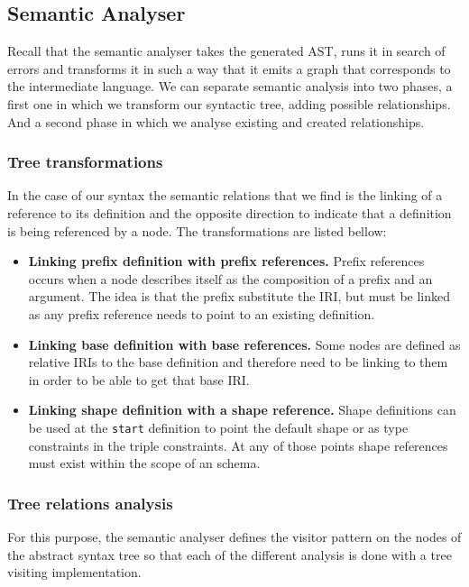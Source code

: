\subsection{Semantic Analyser}
Recall that the semantic analyser takes the generated AST, runs it in search of errors and transforms it in such a way that
it emits a graph that corresponds to the intermediate language. We can separate semantic analysis into two phases, a first
one in which we transform our syntactic tree, adding possible relationships. And a second phase in which we analyse existing
and created relationships.

\subsubsection{Tree transformations}
In the case of our syntax the semantic relations that we find is the linking of a reference to its definition and the opposite
direction to indicate that a definition is being referenced by a node. The transformations are listed bellow:

\begin{itemize}
    \item \textbf{Linking prefix definition with prefix references.} Prefix references occurs when a node describes itself as
    the composition of a prefix and an argument. The idea is that the prefix substitute the IRI, but must be linked as any
    prefix reference needs to point to an existing definition.
    \item \textbf{Linking base definition with base references.} Some nodes are defined as relative IRIs to the base definition
    and therefore need to be linking to them in order to be able to get that base IRI.
    \item \textbf{Linking shape definition with a shape reference.} Shape definitions can be used at the \texttt{start} definition
    to point the default shape or as type constraints in the triple constraints. At any of those points shape references must
    exist within the scope of an schema.
\end{itemize}

\subsubsection{Tree relations analysis}
For this purpose, the semantic analyser defines the visitor pattern on the nodes of the abstract syntax tree so that each of the different
analysis is done with a tree visiting implementation.

